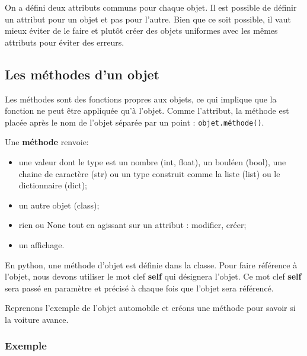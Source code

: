 \documentclass[11pt]{article}
\providecommand{\tightlist}{%
      \setlength{\itemsep}{0pt}\setlength{\parskip}{0pt}}
\begin{document}
On a défini deux attributs communs pour chaque objet. Il est possible de
définir un attribut pour un objet et pas pour l'autre. Bien que ce soit
possible, il vaut mieux éviter de le faire et plutôt créer des objets
uniformes avec les mêmes attributs pour éviter des erreurs.

\hypertarget{les-muxe9thodes-dun-objet}{%
\subsection{Les méthodes d'un objet}\label{les-muxe9thodes-dun-objet}}

Les méthodes sont des fonctions propres aux objets, ce qui implique que
la fonction ne peut être appliquée qu'à l'objet. Comme l'attribut, la
méthode est placée après le nom de l'objet séparée par un point :
\texttt{objet.méthode()}.

Une \textbf{méthode} renvoie:

\begin{itemize}
\tightlist
\item
  une valeur dont le type est un nombre (int, float), un bouléen (bool),
  une chaine de caractère (str) ou un type construit comme la liste
  (list) ou le dictionnaire (dict);
\item
  un autre objet (class);
\item
  rien ou None tout en agissant sur un attribut : modifier, créer;
\item
  un affichage.
\end{itemize}

En python, une méthode d'objet est définie dans la classe. Pour faire
référence à l'objet, nous devons utiliser le mot clef \textbf{self} qui
désignera l'objet. Ce mot clef \textbf{self} sera passé en paramètre et
précisé à chaque fois que l'objet sera référencé.

Reprenons l'exemple de l'objet automobile et créons une méthode pour
savoir si la voiture avance.

\hypertarget{exemple}{%
\subsubsection*{Exemple}\label{exemple}}
\end{document}
